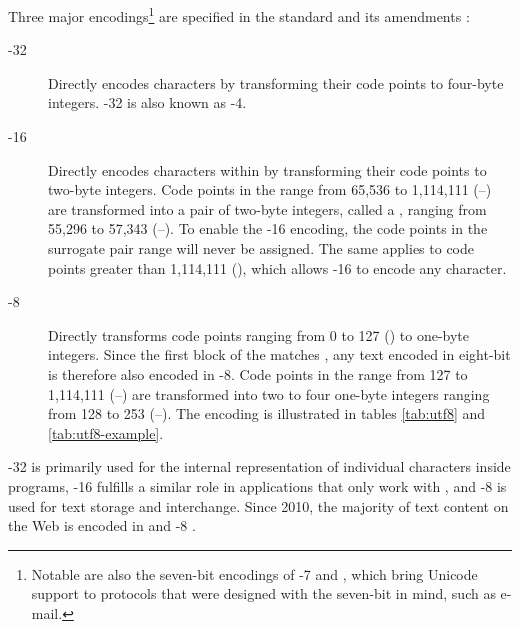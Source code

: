 \documentclass[a5paper,10pt]{book}
\begin{document}
Three major encodings\footnote{
  Notable are also the seven-bit encodings of -7
   and , which bring
  Unicode support to protocols that were designed with the seven-bit
   in mind, such as e-mail.}
are specified in the  standard and its amendments
\cite{iso93:am1,iso93:am2}:
\begin{description}
  \item[-32]Directly
    encodes  characters by transforming their code points to
    four-byte integers. -32 is also known as
    -4.
  \item[-16]
    Directly encodes characters within  by transforming their code
    points to two-byte integers. Code points in the range from 65,536 to
    1,114,111 (\mbox{--}) are transformed into a pair
    of two-byte integers, called a , ranging from
    55,296 to 57,343 (\mbox{--}). To enable the
    -16 encoding, the code points in the surrogate pair range
    will never be assigned. The same applies to code points greater than
    1,114,111 (), which allows -16 to encode any
     character.
  \item[-8]
    Directly transforms code points ranging from 0 to 127 () to one-byte
    integers. Since the first  block of the 
    matches , any text encoded in eight-bit  is
    therefore also encoded in -8. Code points in the range from
    127 to 1,114,111 (\mbox{--}) are transformed into
    two to four one-byte integers ranging from 128 to 253
    (\mbox{--}). The encoding is illustrated in tables
    \ref{tab:utf8} and \ref{tab:utf8-example}.
\end{description}
-32 is primarily used for the internal representation of
individual  characters inside programs, -16 fulfills
a similar role in applications that only work with , and
-8 is used for text storage and interchange. Since 2010, the
majority of text content on the Web is encoded in  and
-8 \cite{qsuccess15}.
\end{document}
